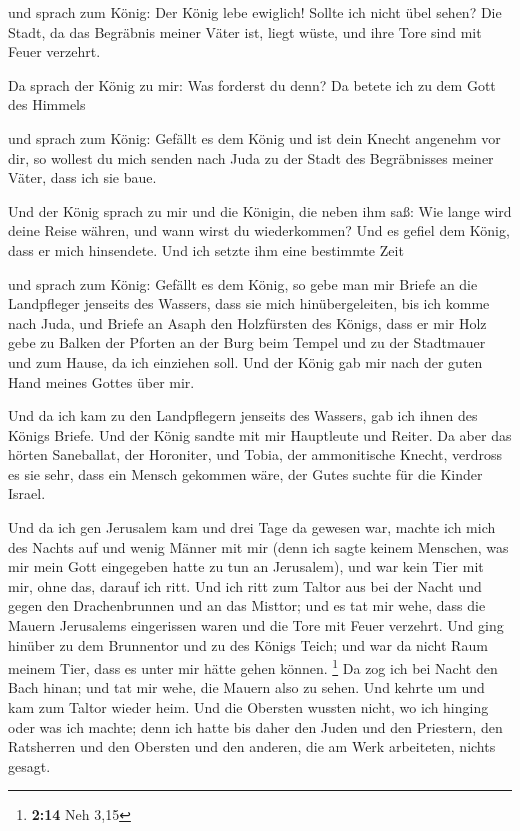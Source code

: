  und sprach zum König: Der König lebe ewiglich! Sollte ich
nicht übel sehen? Die Stadt, da das Begräbnis meiner Väter ist, liegt
wüste, und ihre Tore sind mit Feuer verzehrt.

 Da sprach der König zu mir: Was forderst du denn? Da betete
ich zu dem Gott des Himmels

 und sprach zum König: Gefällt es dem König und ist dein
Knecht angenehm vor dir, so wollest du mich senden nach Juda zu der
Stadt des Begräbnisses meiner Väter, dass ich sie baue.

 Und der König sprach zu mir und die Königin, die neben ihm
saß: Wie lange wird deine Reise währen, und wann wirst du wiederkommen?
Und es gefiel dem König, dass er mich hinsendete. Und ich setzte ihm
eine bestimmte Zeit

 und sprach zum König: Gefällt es dem König, so gebe man mir
Briefe an die Landpfleger jenseits des Wassers, dass sie mich
hinübergeleiten, bis ich komme nach Juda,  und Briefe an
Asaph den Holzfürsten des Königs, dass er mir Holz gebe zu Balken der
Pforten an der Burg beim Tempel und zu der Stadtmauer und zum Hause, da
ich einziehen soll. Und der König gab mir nach der guten Hand meines
Gottes über mir.

 Und da ich kam zu den Landpflegern jenseits des Wassers,
gab ich ihnen des Königs Briefe. Und der König sandte mit mir Hauptleute
und Reiter.  Da aber das hörten Saneballat, der Horoniter,
und Tobia, der ammonitische Knecht, verdross es sie sehr, dass ein
Mensch gekommen wäre, der Gutes suchte für die Kinder Israel.

 Und da ich gen Jerusalem kam und drei Tage da gewesen war,
 machte ich mich des Nachts auf und wenig Männer mit mir
(denn ich sagte keinem Menschen, was mir mein Gott eingegeben hatte zu
tun an Jerusalem), und war kein Tier mit mir, ohne das, darauf ich ritt.
 Und ich ritt zum Taltor aus bei der Nacht und gegen den
Drachenbrunnen und an das Misttor; und es tat mir wehe, dass die Mauern
Jerusalems eingerissen waren und die Tore mit Feuer verzehrt.
 Und ging hinüber zu dem Brunnentor und zu des Königs
Teich; und war da nicht Raum meinem Tier, dass es unter mir hätte gehen
können. \footnote{\textbf{2:14} Neh 3,15}  Da zog ich bei
Nacht den Bach hinan; und tat mir wehe, die Mauern also zu sehen. Und
kehrte um und kam zum Taltor wieder heim.  Und die Obersten
wussten nicht, wo ich hinging oder was ich machte; denn ich hatte bis
daher den Juden und den Priestern, den Ratsherren und den Obersten und
den anderen, die am Werk arbeiteten, nichts gesagt.

